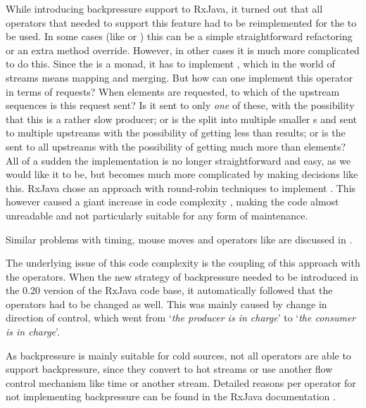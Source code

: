 While introducing backpressure support to RxJava, it turned out that all operators that needed to support this feature had to be reimplemented for the  to be used. In some cases (like  or ) this can be a simple straightforward refactoring or an extra method override. However, in other cases it is much more complicated to do this. Since the \obs is a monad, it has to implement , which in the world of streams means mapping and merging. But how can one implement this  operator in terms of requests? When  elements are requested, to which of the  upstream \obs sequences is this request sent? Is it sent to only \emph{one} of these, with the possibility that this is a rather slow producer; or is the  split into multiple smaller s and sent to multiple upstreams with the possibility of getting less than  results; or is the  sent to all upstreams with the possibility of getting much more than  elements? All of a sudden the implementation is no longer straightforward and easy, as we would like it to be, but becomes much more complicated by making decisions like this. RxJava chose an approach with round-robin techniques to implement . This however caused a giant increase in code complexity \cite{RxJava-source-code}, making the code almost unreadable and not particularly suitable for any form of maintenance.

Similar problems with timing, mouse moves and operators like  are discussed in \cite{meijer2014-Derivation}.

The underlying issue of this code complexity is the coupling of this approach with the operators. When the new strategy of backpressure needed to be introduced in the 0.20 version of the RxJava code base, it automatically followed that the operators had to be changed as well. This was mainly caused by change in direction of control, which went from `\textit{the producer is in charge}' to `\textit{the consumer is in charge}'.

As backpressure is mainly suitable for cold sources, not all operators are able to support backpressure, since they convert to hot streams or use another flow control mechanism like time or another stream. Detailed reasons per operator for not implementing backpressure can be found in the RxJava documentation \cite{rx-api}.

